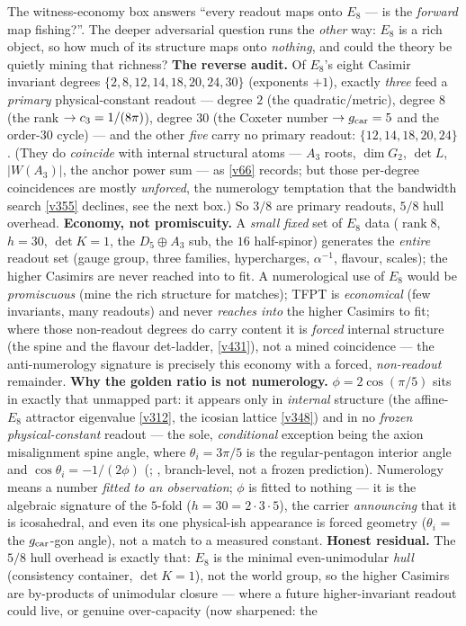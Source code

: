 \begin{winbox}
The witness-economy box answers ``every readout maps onto $E_8$ --- is the \emph{forward} map fishing?''. The deeper adversarial question runs the \emph{other} way: $E_8$ is a rich object, so how much of its structure maps onto \emph{nothing}, and could the theory be quietly mining that richness? \textbf{The reverse audit.} Of $E_8$'s eight Casimir invariant degrees $\{2,8,12,14,18,20,24,30\}$ (exponents $+1$), exactly \emph{three} feed a \emph{primary} physical-constant readout --- degree $2$ (the quadratic/metric), degree $8$ (the rank $\to c_3=1/(8\pi)$), degree $30$ (the Coxeter number $\to g_{\mathrm{car}}=5$ and the order-$30$ cycle) --- and the other \emph{five} carry no primary readout: $\{12,14,18,20,24\}$. (They do \emph{coincide} with internal structural atoms --- $A_3$ roots, $\dim G_2$, $\det L$, $|W(A_3)|$, the anchor power sum --- as \vref{v66} records; but those per-degree coincidences are mostly \emph{unforced}, the numerology temptation that the bandwidth search \vref{v355} declines, see the next box.) So $3/8$ are primary readouts, $5/8$ hull overhead. \textbf{Economy, not promiscuity.} A \emph{small fixed} set of $E_8$ data ($\operatorname{rank}8$, $h{=}30$, $\det K{=}1$, the $D_5{\oplus}A_3$ sub, the $16$ half-spinor) generates the \emph{entire} readout set (gauge group, three families, hypercharges, $\alpha^{-1}$, flavour, scales); the higher Casimirs are never reached into to fit. A numerological use of $E_8$ would be \emph{promiscuous} (mine the rich structure for matches); TFPT is \emph{economical} (few invariants, many readouts) and never \emph{reaches into} the higher Casimirs to fit; where those non-readout degrees do carry content it is \emph{forced} internal structure (the spine and the flavour det-ladder, \vref{v431}), not a mined coincidence --- the anti-numerology signature is precisely this economy with a forced, \emph{non-readout} remainder. \textbf{Why the golden ratio is not numerology.} $\phi=2\cos(\pi/5)$ sits in exactly that unmapped part: it appears only in \emph{internal} structure (the affine-$E_8$ attractor eigenvalue \vref{v312}, the icosian lattice \vref{v348}) and in no \emph{frozen physical-constant} readout --- the sole, \emph{conditional} exception being the axion misalignment spine angle, where $\theta_i=3\pi/5$ is the regular-pentagon interior angle and $\cos\theta_i=-1/(2\phi)$ (; \mC, branch-level, not a frozen prediction). Numerology means a number \emph{fitted to an observation}; $\phi$ is fitted to nothing --- it is the algebraic signature of the $5$-fold ($h{=}30{=}2\cdot3\cdot5$), the carrier \emph{announcing} that it is icosahedral, and even its one physical-ish appearance is forced geometry ($\theta_i$ = the $g_{\mathrm{car}}$-gon angle), not a match to a measured constant. \textbf{Honest residual.} The $5/8$ hull overhead is exactly that: $E_8$ is the minimal even-unimodular \emph{hull} (consistency container, $\det K{=}1$), not the world group, so the higher Casimirs are by-products of unimodular closure --- where a future higher-invariant readout could live, or genuine over-capacity (now sharpened: the 
\end{winbox}
